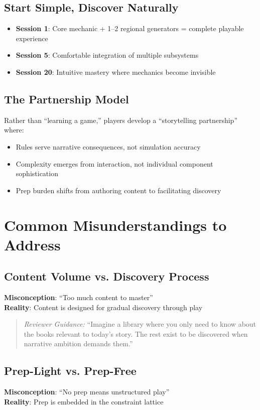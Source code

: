 \documentclass[11pt]{article}
\begin{document}
\subsection{Start Simple, Discover Naturally}
\begin{itemize}
    \item \textbf{Session 1}: Core mechanic + 1–2 regional generators = complete playable experience
    \item \textbf{Session 5}: Comfortable integration of multiple subsystems
    \item \textbf{Session 20}: Intuitive mastery where mechanics become invisible
\end{itemize}

\subsection{The Partnership Model}
Rather than ``learning a game,'' players develop a ``storytelling partnership'' where:
\begin{itemize}
    \item Rules serve narrative consequences, not simulation accuracy
    \item Complexity emerges from interaction, not individual component sophistication
    \item Prep burden shifts from authoring content to facilitating discovery
\end{itemize}

\section{Common Misunderstandings to Address}

\subsection{Content Volume vs. Discovery Process}
\textbf{Misconception}: ``Too much content to master'' \\
\textbf{Reality}: Content is designed for gradual discovery through play

\begin{quote}
\textit{Reviewer Guidance:} ``Imagine a library where you only need to know about the books relevant to today's story. The rest exist to be discovered when narrative ambition demands them.''
\end{quote}

\subsection{Prep-Light vs. Prep-Free}
\textbf{Misconception}: ``No prep means unstructured play'' \\
\textbf{Reality}: Prep is embedded in the constraint lattice
\end{document}

